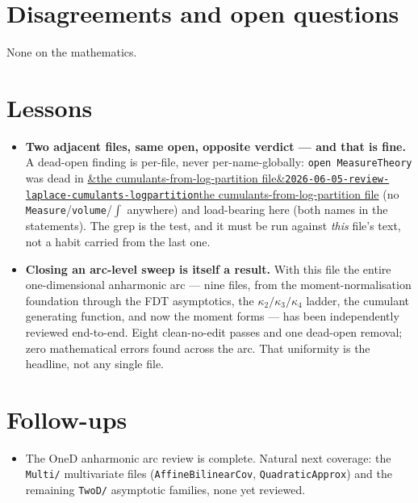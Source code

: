 \documentclass[11pt]{article}
\newcommand{\reviewref}[2][]{\href{https://therisensea.org/reviews/#2/}{\ifx&#1&\texttt{#2}\else#1\fi}}
\begin{document}
\section{Disagreements and open questions}
None on the mathematics.

\section{Lessons}
\begin{itemize}[noitemsep]
  \item \textbf{Two adjacent files, same open, opposite verdict --- and that is fine.} A dead-open finding is
    per-file, never per-name-globally: \texttt{open MeasureTheory} was dead in
    \reviewref[the cumulants-from-log-partition file]{2026-06-05-review-laplace-cumulants-logpartition} (no
    \texttt{Measure}/\texttt{volume}/\texttt{$\int$} anywhere) and load-bearing here (both names in the
    statements). The grep is the test, and it must be run against \emph{this} file's text, not a habit carried
    from the last one.
  \item \textbf{Closing an arc-level sweep is itself a result.} With this file the entire one-dimensional
    anharmonic arc --- nine files, from the moment-normalisation foundation through the FDT asymptotics, the
    $\kappa_2/\kappa_3/\kappa_4$ ladder, the cumulant generating function, and now the moment forms --- has
    been independently reviewed end-to-end. Eight clean-no-edit passes and one dead-open removal; zero
    mathematical errors found across the arc. That uniformity is the headline, not any single file.
\end{itemize}

\section{Follow-ups}
\begin{itemize}[noitemsep]
  \item The OneD anharmonic arc review is complete. Natural next coverage: the \texttt{Multi/} multivariate
    files (\texttt{AffineBilinearCov}, \texttt{QuadraticApprox}) and the remaining \texttt{TwoD/} asymptotic
    families, none yet reviewed.
\end{itemize}
\end{document}
